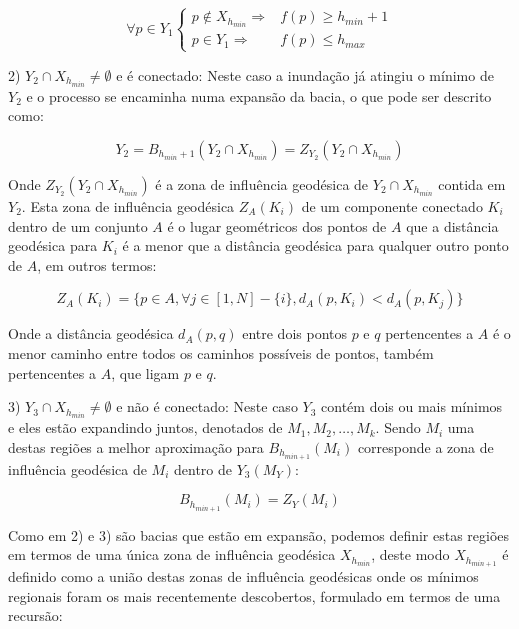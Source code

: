 \begin{equation}\label{eq:watershed_caso1}
  \forall p \in Y_1 \left\{
    \begin{array}{rc}
      p \notin X_{h_{min}} \Rightarrow & f(p) \ge h_{min} + 1 \\
                 p \in Y_1 \Rightarrow & f(p) \le h_{max}
    \end{array}
  \right.
\end{equation}

2) $ Y_2 \cap X_{h_{min}} \neq \emptyset $ e é conectado: Neste caso a inundação já atingiu o
mínimo de $ Y_2 $ e o processo se encaminha numa expansão da bacia, o que pode
ser descrito como:

\begin{equation}\label{eq:watershed_caso21}
  Y_2 = B_{h_{min} + 1}(Y_2 \cap X_{h_{min}}) = Z_{Y_2}(Y_2 \cap X_{h_{min}})
\end{equation}

Onde $ Z_{Y_2}(Y_2 \cap X_{h_{min}}) $ é a zona de influência geodésica de
$ Y_2 \cap X_{h_{min}} $ contida em $ Y_2 $. Esta zona de influência
geodésica $ Z_A(K_i) $ de um componente conectado $ K_i $ dentro de um conjunto $ A $
é o lugar geométricos dos pontos
de $ A $ que a distância geodésica para $ K_i $ é a menor que a distância
geodésica para qualquer outro ponto de $ A $, em outros termos:

\begin{equation}\label{eq:watershed_caso22}
  Z_A(K_i) = \{ p \in A, \forall j \in [1, N] - \{ i \}, d_A(p, K_i) < d_A(p, K_j) \}
\end{equation}

Onde a distância geodésica $ d_A(p, q) $ entre dois pontos $ p $ e $ q $
pertencentes a $ A $ é o menor caminho entre todos os caminhos possíveis de
pontos, também pertencentes a $ A $, que ligam $ p $ e $ q $.

3) $ Y_3 \cap X_{h_{min}} \neq \emptyset $ e não é conectado: Neste caso $ Y_3 $
contém dois ou mais mínimos e eles estão expandindo juntos, denotados de
$ M_1, M_2, …, M_k $. Sendo $ M_i $ uma destas regiões a melhor aproximação
para $ B_{h_{min + 1}}(M_i) $ corresponde a zona de influência geodésica de $ M_i $
dentro de $ Y_3(M_Y)$:

\begin{equation}\label{eq:watershed_caso3}
  B_{h_{min + 1}}(M_i) = Z_Y(M_i)
\end{equation}

Como em 2) e 3) são bacias que estão em expansão, podemos definir estas regiões em termos
de uma única zona de influência geodésica $ X_{h_{min}} $, deste modo
$ X_{h_{min + 1}} $ é definido como a união destas zonas de influência geodésicas
onde os mínimos regionais foram os mais recentemente descobertos,
formulado em termos de uma recursão:

